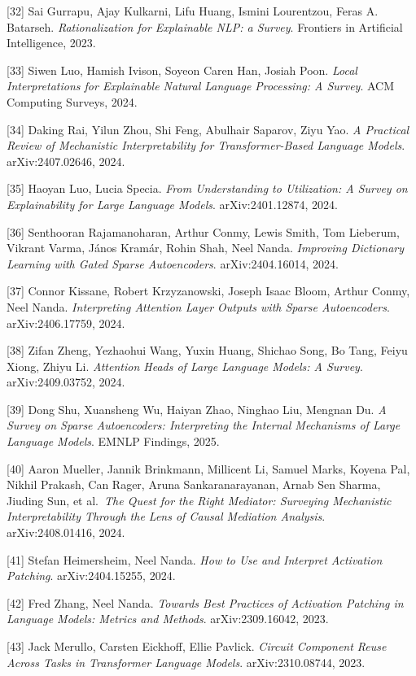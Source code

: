 {[}32{]} Sai Gurrapu, Ajay Kulkarni, Lifu Huang, Ismini Lourentzou, Feras A. Batarseh. \emph{Rationalization for Explainable NLP: a Survey}. Frontiers in Artificial Intelligence, 2023.

{[}33{]} Siwen Luo, Hamish Ivison, Soyeon Caren Han, Josiah Poon. \emph{Local Interpretations for Explainable Natural Language Processing: A Survey}. ACM Computing Surveys, 2024.

{[}34{]} Daking Rai, Yilun Zhou, Shi Feng, Abulhair Saparov, Ziyu Yao. \emph{A Practical Review of Mechanistic Interpretability for Transformer-Based Language Models}. arXiv:2407.02646, 2024.

{[}35{]} Haoyan Luo, Lucia Specia. \emph{From Understanding to Utilization: A Survey on Explainability for Large Language Models}. arXiv:2401.12874, 2024.

{[}36{]} Senthooran Rajamanoharan, Arthur Conmy, Lewis Smith, Tom Lieberum, Vikrant Varma, János Kramár, Rohin Shah, Neel Nanda. \emph{Improving Dictionary Learning with Gated Sparse Autoencoders}. arXiv:2404.16014, 2024.

{[}37{]} Connor Kissane, Robert Krzyzanowski, Joseph Isaac Bloom, Arthur Conmy, Neel Nanda. \emph{Interpreting Attention Layer Outputs with Sparse Autoencoders}. arXiv:2406.17759, 2024.

{[}38{]} Zifan Zheng, Yezhaohui Wang, Yuxin Huang, Shichao Song, Bo Tang, Feiyu Xiong, Zhiyu Li. \emph{Attention Heads of Large Language Models: A Survey}. arXiv:2409.03752, 2024.

{[}39{]} Dong Shu, Xuansheng Wu, Haiyan Zhao, Ninghao Liu, Mengnan Du. \emph{A Survey on Sparse Autoencoders: Interpreting the Internal Mechanisms of Large Language Models}. EMNLP Findings, 2025.

{[}40{]} Aaron Mueller, Jannik Brinkmann, Millicent Li, Samuel Marks, Koyena Pal, Nikhil Prakash, Can Rager, Aruna Sankaranarayanan, Arnab Sen Sharma, Jiuding Sun, et al.~\emph{The Quest for the Right Mediator: Surveying Mechanistic Interpretability Through the Lens of Causal Mediation Analysis}. arXiv:2408.01416, 2024.

{[}41{]} Stefan Heimersheim, Neel Nanda. \emph{How to Use and Interpret Activation Patching}. arXiv:2404.15255, 2024.

{[}42{]} Fred Zhang, Neel Nanda. \emph{Towards Best Practices of Activation Patching in Language Models: Metrics and Methods}. arXiv:2309.16042, 2023.

{[}43{]} Jack Merullo, Carsten Eickhoff, Ellie Pavlick. \emph{Circuit Component Reuse Across Tasks in Transformer Language Models}. arXiv:2310.08744, 2023.

